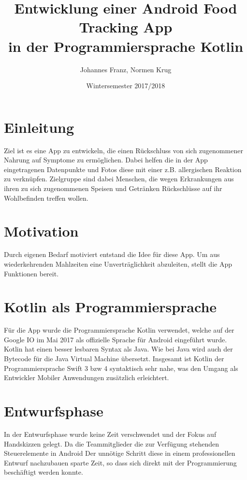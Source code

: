 \documentclass[
    DIV12,
    cleardouble=plain,
    headings=normal,
    pdftex,
    headexclude,footexclude,
    final
]{scrreprt}
\title{
  Entwicklung einer Android Food Tracking App \\[1em]
  in der Programmiersprache Kotlin  
}
\author{Johannes Franz, Normen Krug}
\date{Wintersemester 2017/2018}
\begin{document}
\maketitle



\tableofcontents


\newpage
{}


\chapter{Einleitung}
Ziel ist es eine App zu entwickeln, die einen Rückschluss von sich zugenommener Nahrung auf Symptome zu ermöglichen. Dabei helfen die in der App eingetragenen Datenpunkte und Fotos diese mit einer z.B. allergischen Reaktion zu verknüpfen.
Zielgruppe sind dabei Menschen, die wegen Erkrankungen aus ihren zu sich zugenommenen Speisen und Getränken Rückschlüsse auf ihr Wohlbefinden treffen wollen.


\newpage

\chapter{Motivation}
Durch eigenen Bedarf motiviert entstand die Idee für diese App. Um aus wiederkehrenden Mahlzeiten eine Unverträglichkeit abzuleiten, stellt die App Funktionen bereit.



\chapter{Kotlin als Programmiersprache}
Für die App wurde die Programmiersprache Kotlin verwendet, welche auf der Google IO im Mai 2017 als offizielle Sprache für Android eingeführt wurde. Kotlin hat einen besser lesbaren Syntax als Java. Wie bei Java wird auch der Bytecode für die Java Virtual Machine übersetzt. Insgesamt ist Kotlin der Programmiersprache Swift 3 bzw 4 syntaktisch sehr nahe, was den Umgang als Entwickler Mobiler Anwendungen zusätzlich erleichtert.


\newpage

\chapter{Entwurfsphase}
In der Entwurfsphase wurde keine Zeit verschwendet und der Fokus auf Handskizzen gelegt. Da die Teammitglieder die zur Verfügung stehenden Steuerelemente in Android  Der unnötige Schritt diese in einem professionellen Entwurf nachzubauen sparte Zeit, so dass sich direkt mit der Programmierung beschäftigt werden konnte.
\end{document}
